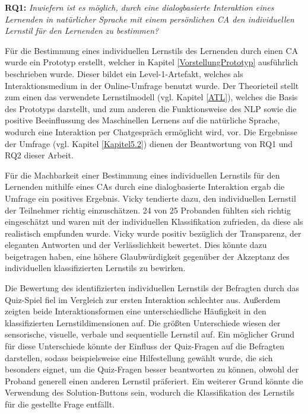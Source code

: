 \textbf{RQ1:} \textit{\glqq Inwiefern ist es möglich, durch eine dialogbasierte Interaktion eines Lernenden in natürlicher Sprache mit einem persönlichen CA den individuellen Lernstil für den Lernenden zu bestimmen?\grqq{}} 

Für die Bestimmung eines individuellen Lernstils des Lernenden durch einen CA wurde ein Prototyp 
erstellt, welcher in Kapitel \ref{VorstellungPrototyp} ausführlich beschrieben wurde. Dieser bildet ein 
Level-1-Artefakt, welches als Interaktionsmedium in der Online-Umfrage
benutzt wurde. Der Theorieteil stellt 
zum einen das verwendete Lernstilmodell (vgl. Kapitel \ref{ATL}), welches die Basis des Prototyps darstellt,
und zum anderen die Funktionsweise des NLP sowie die positive Beeinflussung des Maschinellen Lernens
auf die natürliche Sprache, wodurch eine Interaktion per Chatgespräch ermöglicht wird, vor. 
Die Ergebnisse der Umfrage (vgl. Kapitel \ref{Kapitel5.2}) dienen der Beantwortung
von RQ1 und RQ2 dieser Arbeit.

Für die Machbarkeit einer Bestimmung eines individuellen Lernstils für den Lernenden mithilfe eines CAs
durch eine dialogbasierte Interaktion ergab die Umfrage ein positives Ergebnis. Vicky tendierte dazu, 
den individuellen Lernstil der Teilnehmer richtig einzuschätzen. 24 von 25 Probanden fühlten sich 
richtig eingeschätzt und waren mit der individuellen Klassifikation zufrieden, da diese als realistisch empfunden wurde.
Vicky wurde positiv bezüglich der Transparenz, der eleganten Antworten und der Verlässlichkeit bewertet. Dies könnte dazu
beigetragen haben, eine höhere Glaubwürdigkeit gegenüber der Akzeptanz des individuellen klassifizierten Lernstils zu
bewirken.

Die Bewertung des identifizierten individuellen Lernstils der Befragten durch das Quiz-Spiel fiel im Vergleich zur ersten 
Interaktion schlechter aus. Außerdem zeigten beide Interaktionsformen eine unterschiedliche Häufigkeit in den 
klassifizierten Lernstildimensionen auf.
Die größten Unterschiede wiesen der sensorische, visuelle, verbale und sequentielle Lernstil auf.
Ein möglicher Grund für diese Unterschiede könnte der Einfluss der Quiz-Fragen auf die Befragten darstellen,
sodass beispielsweise eine Hilfestellung gewählt wurde, die sich besonders eignet, um die Quiz-Fragen besser beantworten zu können,
obwohl der Proband generell einen anderen Lernstil präferiert. Ein weiterer Grund könnte die Verwendung des 
\glqq Solution-Buttons\grqq{} sein, wodurch die Klassifikation des Lernstils für die gestellte Frage entfällt.

